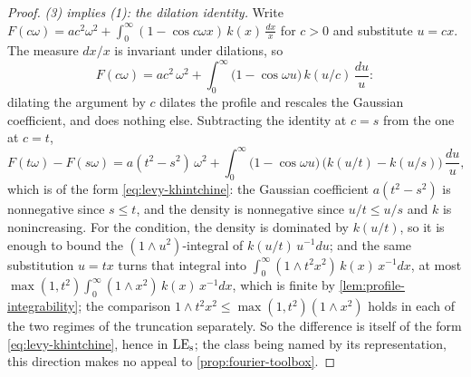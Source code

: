 \begin{proof}
\leanok
\emph{(3) implies (1): the dilation identity.} Write
$F(c\omega) = ac^2\omega^2 + \int_0^\infty (1 - \cos c\omega x)\,k(x)\,\frac{dx}{x}$ for
$c > 0$ and substitute $u = cx$. The measure $dx/x$ is invariant under dilations, so
\[
  F(c\omega) = a c^2\,\omega^2
   + \int_0^\infty \bigl(1 - \cos\omega u\bigr)\,k(u/c)\,\frac{du}{u} :
\]
dilating the argument by $c$ dilates the profile and rescales the Gaussian coefficient, and
does nothing else. Subtracting the identity at $c = s$ from the one at $c = t$,
\begin{equation}\label{eq:dilation-difference}
  F(t\omega) - F(s\omega) = a(t^2 - s^2)\,\omega^2
   + \int_0^\infty \bigl(1 - \cos\omega u\bigr)\,\bigl(k(u/t) - k(u/s)\bigr)\,\frac{du}{u},
\end{equation}
which is of the form \ref{eq:levy-khintchine}: the Gaussian coefficient $a(t^2-s^2)$ is
nonnegative since $s \le t$, and the density is nonnegative since $u/t \le u/s$ and $k$ is
nonincreasing. For the \Levy{} condition, the density is dominated by $k(u/t)$, so it is enough to
bound the $(1 \wedge u^2)$-integral of $k(u/t)\,u^{-1}du$; and the same substitution $u = tx$
turns that integral into $\int_0^\infty (1 \wedge t^2x^2)\,k(x)\,x^{-1}dx$, at most
$\max(1,t^2)\int_0^\infty (1 \wedge x^2)\,k(x)\,x^{-1}dx$, which is finite by
\ref{lem:profile-integrability}; the comparison $1 \wedge t^2x^2 \le \max(1,t^2)(1 \wedge x^2)$
holds in each of the two regimes of the truncation separately. So the difference is itself of
the form \ref{eq:levy-khintchine}, hence in $\mathrm{LE}_{\mathrm{s}}$; the class being named by its
representation, this direction makes no appeal to \ref{prop:fourier-toolbox}.


\end{proof}

